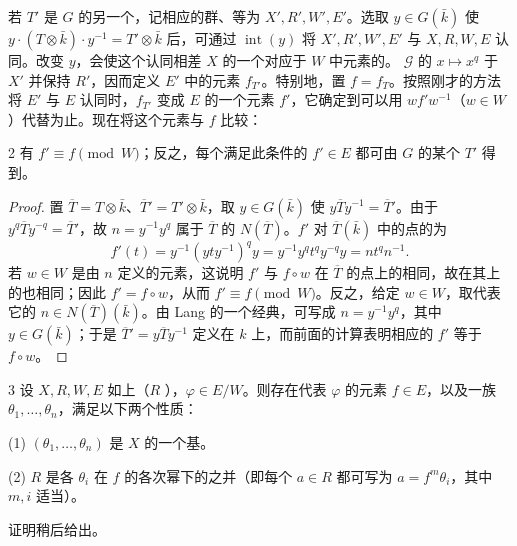 若 $T'$ 是 $G$ 的另一个，记相应的群、等为 $X',R',W',E'$。选取 $y\in G(\bar k)$ 使 $y\cdot(T\otimes\bar k)\cdot y^{-1}=T'\otimes\bar k$ 后，可通过 $\operatorname{int}(y)$ 将 $X',R',W',E'$ 与 $X,R,W,E$ 认同。改变 $y$，会使这个认同相差 $X$ 的一个对应于 $W$ 中元素的。
$\mathcal G$ 的 $x\mapsto x^q$ 于 $X'$ 并保持 $R'$，因而定义 $E'$ 中的元素 $f_{T'}$。特别地，置 $f=f_T$。按照刚才的方法将 $E'$ 与 $E$ 认同时，$f_{T'}$ 变成 $E$ 的一个元素 $f'$，它确定到可以用 $wf'w^{-1}$（$w\in W$）代替为止。现在将这个元素与 $f$ 比较：
\begin{SGAresult}{}{2}
有 $f'\equiv f\pmod W$；反之，每个满足此条件的 $f'\in E$ 都可由 $G$ 的某个 $T'$ 得到。
\end{SGAresult}
\begin{proof}
置 $\overline T=T\otimes\bar k$、$\overline T'=T'\otimes\bar k$，取 $y\in G(\bar k)$ 使 $y\overline Ty^{-1}=\overline T'$。由于 $y^q\overline Ty^{-q}=\overline T'$，故 $n=y^{-1}y^q$ 属于 $\overline T$ 的 $N(\overline T)$。$f'$ 对 $\overline T(\bar k)$ 中的点的为
\[f'(t)=y^{-1}(yty^{-1})^qy
=y^{-1}y^qt^qy^{-q}y=nt^qn^{-1}.\]
若 $w\in W$ 是由 $n$ 定义的元素，这说明 $f'$ 与 $f\circ w$ 在 $\overline T$ 的点上的相同，故在其上的也相同；因此 $f'=f\circ w$，从而 $f'\equiv f\pmod W$。反之，给定 $w\in W$，取代表它的 $n\in N(\overline T)(\bar k)$。由 Lang 的一个经典，可写成 $n=y^{-1}y^q$，其中 $y\in G(\bar k)$；于是 $\overline T'=y\overline Ty^{-1}$ 定义在 $k$ 上，而前面的计算表明相应的 $f'$ 等于 $f\circ w$。
\end{proof}
\begin{SGAresult}{}{3}
设 $X,R,W,E$ 如上（$R$ ），$\varphi\in E/W$。则存在代表 $\varphi$ 的元素 $f\in E$，以及一族 $\theta_1,\ldots,\theta_n$，满足以下两个性质：

(1) $(\theta_1,\ldots,\theta_n)$ 是 $X$ 的一个基。

(2) $R$ 是各 $\theta_i$ 在 $f$ 的各次幂下的之并（即每个 $a\in R$ 都可写为 $a=f^m\theta_i$，其中 $m,i$ 适当）。
\end{SGAresult}
证明稍后给出。


